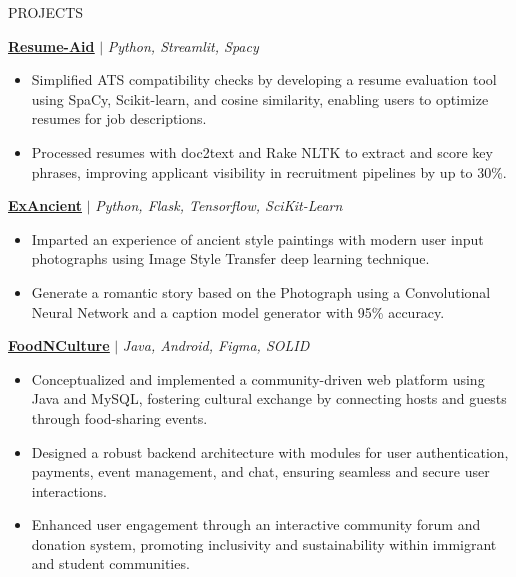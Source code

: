 \documentclass{resume} %
\begin{document}

\begin{rSection}{PROJECTS}
\vspace{0.05em}

\href{https://github.com/RutvikJ77/Resume-aid}{\textbf{\underline{Resume-Aid}}} $|$\textit{ Python, Streamlit, Spacy}
\begin{itemize}
    \item Simplified ATS compatibility checks by developing a resume evaluation tool using SpaCy, Scikit-learn, and cosine similarity, enabling users to optimize resumes for job descriptions.
    \item Processed resumes with doc2text and Rake NLTK to extract and score key phrases, improving applicant visibility in recruitment pipelines by up to 30\%.
\end{itemize}

\href{https://github.com/RutvikJ77/ExAncient}{\textbf{\underline{ExAncient}}} $|$\textit{ Python, Flask, Tensorflow, SciKit-Learn}
\begin{itemize}
    \item {Imparted an experience of ancient style paintings with modern user input photographs using Image Style Transfer deep learning technique.}
    \item {Generate a romantic story based on the Photograph using a Convolutional Neural Network and a caption model generator with 95\% accuracy.}
\end{itemize}

\href{https://github.com/RutvikJ77/FoodNCulture}{\textbf{\underline{FoodNCulture}}} $|$\textit{ Java, Android, Figma, SOLID}
\begin{itemize}
  \item Conceptualized and implemented a community-driven web platform using Java and MySQL, fostering cultural exchange by connecting hosts and guests through food-sharing events.
  \item Designed a robust backend architecture with modules for user authentication, payments, event management, and chat, ensuring seamless and secure user interactions.
  \item Enhanced user engagement through an interactive community forum and donation system, promoting inclusivity and sustainability within immigrant and student communities.
\end{itemize}


\end{rSection}
\end{document}
